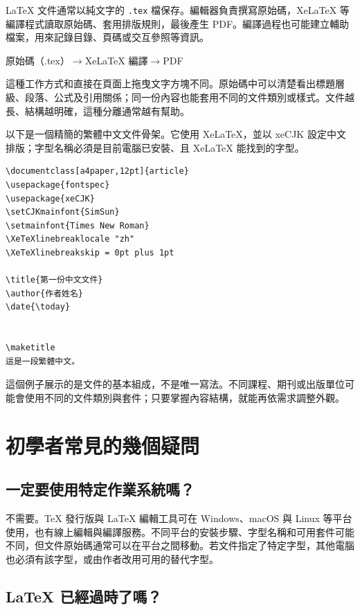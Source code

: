 LaTeX 文件通常以純文字的 \texttt{.tex} 檔保存。編輯器負責撰寫原始碼，XeLaTeX 等編譯程式讀取原始碼、套用排版規則，最後產生 PDF。編譯過程也可能建立輔助檔案，用來記錄目錄、頁碼或交互參照等資訊。

\begin{center}
原始碼（.tex）\quad $\longrightarrow$\quad XeLaTeX 編譯\quad $\longrightarrow$\quad PDF
\end{center}

這種工作方式和直接在頁面上拖曳文字方塊不同。原始碼中可以清楚看出標題層級、段落、公式及引用關係；同一份內容也能套用不同的文件類別或樣式。文件越長、結構越明確，這種分離通常越有幫助。

以下是一個精簡的繁體中文文件骨架。它使用 XeLaTeX，並以 xeCJK 設定中文排版；字型名稱必須是目前電腦已安裝、且 XeLaTeX 能找到的字型。

\begin{verbatim}
\documentclass[a4paper,12pt]{article}
\usepackage{fontspec}
\usepackage{xeCJK}
\setCJKmainfont{SimSun}
\setmainfont{Times New Roman}
\XeTeXlinebreaklocale "zh"
\XeTeXlinebreakskip = 0pt plus 1pt

\title{第一份中文文件}
\author{作者姓名}
\date{\today}


\maketitle
這是一段繁體中文。

\end{verbatim}

這個例子展示的是文件的基本組成，不是唯一寫法。不同課程、期刊或出版單位可能會使用不同的文件類別與套件；只要掌握內容結構，就能再依需求調整外觀。

\section{初學者常見的幾個疑問}

\subsection{一定要使用特定作業系統嗎？}

不需要。TeX 發行版與 LaTeX 編輯工具可在 Windows、macOS 與 Linux 等平台使用，也有線上編輯與編譯服務。不同平台的安裝步驟、字型名稱和可用套件可能不同，但文件原始碼通常可以在平台之間移動。若文件指定了特定字型，其他電腦也必須有該字型，或由作者改用可用的替代字型。

\subsection{LaTeX 已經過時了嗎？}


